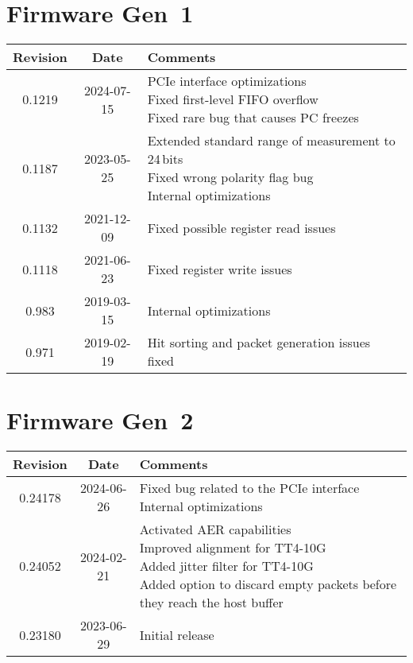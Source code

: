 \section{Firmware Gen~1}
\begin{tabularx}{\textwidth}{|c|c|X|}
    \hline
    Revision & Date & Comments\\
    \hline\hline
    \hypertarget{fwrev}{0.1219} & 2024-07-15 & 
    \makecell[l] {
        PCIe interface optimizations\\*
        Fixed first-level FIFO overflow\\*
        Fixed rare bug that causes PC freezes\\*
    }\\
    \hline
    0.1187 & 2023-05-25 & 
    \makecell[l] {
        Extended standard range of measurement to 24\,bits\\*
        Fixed wrong polarity flag bug\\*
        Internal optimizations
    }\\
    \hline
    0.1132 & 2021-12-09 & Fixed possible register read issues\\
    \hline
	0.1118 & 2021-06-23 & Fixed register write issues\\
    \hline
    0.983 & 2019-03-15 & Internal optimizations\\
    \hline
    0.971 & 2019-02-19 & Hit sorting and packet generation issues fixed\\
    \hline
\end{tabularx}

\section{Firmware Gen~2}
\begin{tabularx}{\textwidth}{|c|c|X|}
    \hline
    Revision & Date & Comments\\
    \hline\hline
    0.24178 & 2024-06-26 &
    \makecell[l]{
        Fixed bug related to the PCIe interface\\*
        Internal optimizations\\*
    }\\
    \hline
    0.24052 & 2024-02-21 &
    \makecell[l]{
        Activated AER capabilities\\*
        Improved alignment for TT4-10G\\*
        Added jitter filter for TT4-10G\\*
        Added option to discard empty packets before they reach the host buffer\\*
    }\\
    \hline
    0.23180 & 2023-06-29 & Initial release\\ 
    \hline
\end{tabularx}